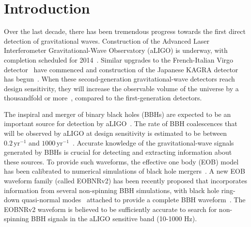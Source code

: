 
\section{Introduction}
Over the last decade, there has been tremendous progress towards the
first direct detection of gravitational waves. Construction of the Advanced
Laser Interferometer Gravitational-Wave Observatory (aLIGO) is underway, with
completion scheduled for 2014~\cite{Harry:2010zz}. Similar upgrades to
the French-Italian Virgo detector~\citep{aVIRGO} have commenced and construction
of the Japanese KAGRA detector has begun~\citep{Somiya:2011np}.  When these
second-generation gravitational-wave detectors reach design sensitivity, they
will increase the observable volume of the universe by a thousandfold or
more~\citep{aLIGOsensitivity}, compared to the first-generation detectors.

The inspiral and merger of binary black holes (BBHs) are expected to be an important source for detection by
aLIGO~\citep{300yrsofGravitation}.  The rate of BBH coalescences that will be
observed by aLIGO at design sensitivity is estimated to be between
$0.2\,\mathrm{yr}^{-1}$ and $1000\,\mathrm{yr}^{-1}$~\citep{LSCCBCRates2010}.
Accurate knowledge of the gravitational-wave signals generated by BBHs is
crucial for detecting and extracting information about these sources.  
To provide such waveforms, the effective one body (EOB)
model~\citep{EOBOriginalBuonannoDamour} has been calibrated to numerical
simulations of black hole
mergers~\citep{EOBNR01,EOBNRdevel01,EOBNRdevel02,EOBNRdevel03,EOBNRdevel04,EOBdevel01,EOBdevel02,BuonannoEOBv2Main}.
A new EOB waveform family (called EOBNRv2) has been recently proposed that
incorporates information from several non-spinning BBH simulations, with black
hole ring-down quasi-normal modes~\citep{BHRDQNMs,BHPTMinoSasaki} attached to
provide a complete BBH waveform~\citep{BuonannoEOBv2Main}.  The EOBNRv2
waveform is believed to be sufficiently accurate to search for non-spinning
BBH signals in the aLIGO sensitive band (10-1000 Hz). 

